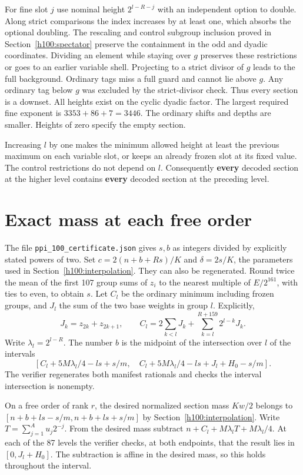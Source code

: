 \documentclass[11pt]{article}
\numberwithin{equation}{section}
\theoremstyle{definition}
\theoremstyle{remark}
\begin{document}
For fine slot \(j\) use nominal height \(2^{l-R-j}\) with an independent option to double. Along strict comparisons the index increases by at least one, which absorbs the optional doubling. The rescaling and control subgroup inclusion proved in Section~\ref{h100:spectator} preserve the containment in the odd and dyadic coordinates. Dividing an element while staying over \(g\) preserves these restrictions or goes to an earlier variable shell. Projecting to a strict divisor of \(g\) leads to the full background. Ordinary tags miss a full guard and cannot lie above \(g\). Any ordinary tag below \(g\) was excluded by the strict-divisor check. Thus every section is a downset. All heights exist on the cyclic dyadic factor. The largest required fine exponent is \(3353+86+7=3446\). The ordinary shifts and depths are smaller. Heights of zero specify the empty section.

Increasing \(l\) by one makes the minimum allowed height at least the previous maximum on each variable slot, or keeps an already frozen slot at its fixed value. The control restrictions do not depend on \(l\). Consequently \textbf{every} decoded section at the higher level contains \textbf{every} decoded section at the preceding level.

\section{Exact mass at each free order}\label{h100:mass}

The file \texttt{ppi\_100\_certificate.json} gives \(s,b\) as integers divided by explicitly stated powers of two. Set \(c=2(n+b+Rs)/K\) and \(\delta=2s/K\), the parameters used in Section~\ref{h100:interpolation}. They can also be regenerated. Round twice the mean of the first 107 group sums of \(z_i\) to the nearest multiple of \(E/2^{161}\), with ties to even, to obtain \(s\). Let \(C_l\) be the ordinary minimum including frozen groups, and \(J_l\) the sum of the two base weights in group \(l\). Explicitly,
\[
 J_k=z_{2k}+z_{2k+1},\qquad
 C_l=2\sum_{k<l}J_k+\sum_{k=l}^{R+159}2^{l-k}J_k.
\]
Write \(\lambda_l=2^{l-R}\). The number \(b\) is the midpoint of the intersection over \(l\) of the intervals \[
 \left[C_l+5M\lambda_l/4-ls+s/m,\quad
       C_l+5M\lambda_l/4-ls+J_l+H_0-s/m\right].
\] The verifier regenerates both manifest rationals and checks the interval intersection is nonempty.

On a free order of rank \(r\), the desired normalized section mass \(Kw/2\) belongs to \([n+b+ls-s/m,n+b+ls+s/m]\) by Section~\ref{h100:interpolation}. Write \(T=\sum_{j=1}^A u_j2^{-j}\). From the desired mass subtract \(n+C_l+M\lambda_l T+M\lambda_l/4\). At each of the 87 levels the verifier checks, at both endpoints, that the result lies in \([0,J_l+H_0]\). The subtraction is affine in the desired mass, so this holds throughout the interval.
\end{document}
